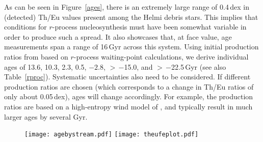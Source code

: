 \documentclass[twocolumn]{aastex63}
\begin{document}
As can be seen in Figure~\ref{ages}, there is an extremely large range of 0.4\,dex in (detected) Th/Eu values present among the Helmi debris stars. This implies that conditions for $r$-process nucleosynthesis must have been somewhat variable in order to produce such a spread. It also showcases that, at face value, age measurements span a range of 16\,Gyr across this system. Using initial production ratios from \citet{Schatz02} based on $r$-process waiting-point calculations, we derive individual ages of 13.6, 10.3, 2.3, 0.5, $-2.8$, $>$\,$-$15.0, and $>$\,$-$22.5\,Gyr (see also Table~\ref{rproc}).  Systematic uncertainties also need to be considered. If different production ratios are chosen (which corresponds to a change in Th/Eu ratios of only about 0.05\,dex), ages will change accordingly. For example, the \citet{hill17} production ratios are based on a high-entropy wind model of \citet{Farouqi10}, and typically result in much larger ages by several Gyr. 

\begin{figure}[ht]
  \texttt{[image: agebystream.pdf]} \texttt{[image: theufeplot.pdf]} 
  \end{figure}
\end{document}
